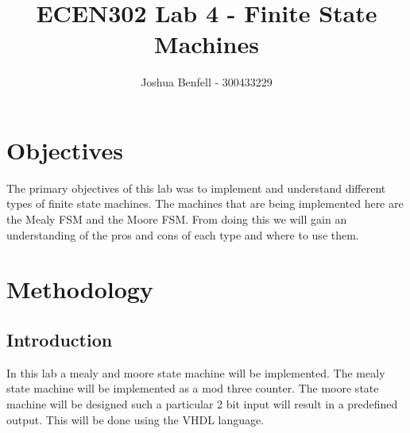 \documentclass[a4paper, 12pt]{article}
\title{ECEN302 Lab 4 - Finite State Machines}
\author{Joshua Benfell - 300433229}
\begin{document}
	\maketitle
	
	\section{Objectives}
		The primary objectives of this lab was to implement and understand different types of finite state machines. The machines that are being implemented here are the Mealy FSM and the Moore FSM. From doing this we will gain an understanding of the pros and cons of each type and where to use them.
	\section{Methodology}
		\subsection{Introduction}
			In this lab a mealy and moore state machine will be implemented. The mealy state machine will be implemented as a mod three counter. The moore state machine will be designed such a particular 2 bit input will result in a predefined output. This will be done using the VHDL language.
\end{document}
